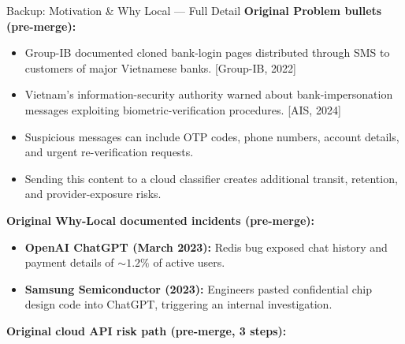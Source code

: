 
\begin{frame}[allowframebreaks]{Backup: Motivation \& Why Local --- Full Detail}
  {\footnotesize\textbf{Original Problem bullets (pre-merge):}}
  \begin{itemize}\footnotesize
    \item Group-IB documented cloned bank-login pages distributed through SMS
          to customers of major Vietnamese banks. {\scriptsize [Group-IB, 2022]}
    \item Vietnam's information-security authority warned about bank-impersonation
          messages exploiting biometric-verification procedures. {\scriptsize [AIS, 2024]}
    \item Suspicious messages can include OTP codes, phone numbers, account details,
          and urgent re-verification requests.
    \item Sending this content to a cloud classifier creates additional transit,
          retention, and provider-exposure risks.
  \end{itemize}
  \vspace{4pt}
  {\footnotesize\textbf{Original Why-Local documented incidents (pre-merge):}}
  \begin{itemize}\footnotesize
    \setlength{\itemsep}{0.25em}
    \item \textbf{OpenAI ChatGPT (March 2023):} Redis bug exposed chat history and payment details of ${\sim}1.2\%$ of active users.
    \item \textbf{Samsung Semiconductor (2023):} Engineers pasted confidential chip design code into ChatGPT, triggering an internal investigation.
  \end{itemize}
  \vspace{4pt}
  {\footnotesize\textbf{Original cloud API risk path (pre-merge, 3 steps):}}
  \begin{itemize}\footnotesize

\end{itemize}
\end{frame}
